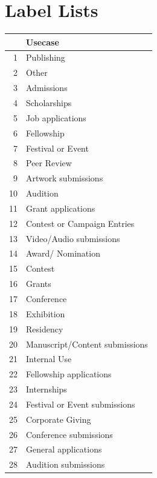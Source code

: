 \documentclass[]{report}   %
\begin{document}
\appendix
\appendixpage
\addappheadtotoc
\section{Label Lists}
\label{app:labels}
\begin{minipage}{0.5\textwidth}
\centering
\begin{tabular}{rl}
  \hline
 & Usecase \\ 
  \hline
1 & Publishing \\ 
  2 & Other \\ 
  3 & Admissions \\ 
  4 & Scholarships \\ 
  5 & Job applications \\ 
  6 & Fellowship \\ 
  7 & Festival or Event \\ 
  8 & Peer Review \\ 
  9 & Artwork submissions \\ 
  10 & Audition \\ 
  11 & Grant applications \\ 
  12 & Contest or Campaign Entries \\ 
  13 & Video/Audio submissions \\ 
  14 & Award/ Nomination \\ 
  15 & Contest \\ 
  16 & Grants \\ 
  17 & Conference \\ 
  18 & Exhibition \\ 
  19 & Residency \\ 
  20 & Manuscript/Content submissions \\ 
  21 & Internal Use \\ 
  22 & Fellowship applications \\ 
  23 & Internships \\ 
  24 & Festival or Event submissions \\ 
  25 & Corporate Giving \\ 
  26 & Conference submissions \\ 
  27 & General applications \\ 
  28 & Audition submissions \\ 
   \hline
\end{tabular}
\end{minipage}
\newpage
\end{document}
